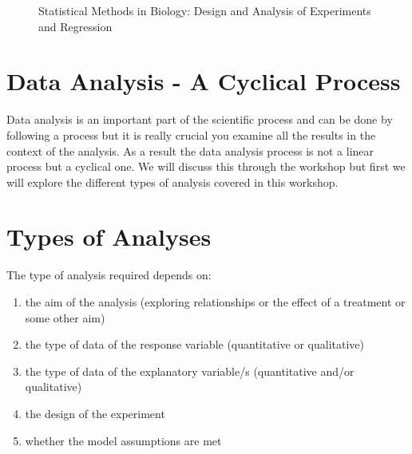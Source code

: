 \documentclass[a4paper, 10pt, fleqn, twosided]{memoir}
\begin{document}
\begin{figure}[!hbtp]
\centering
{}
\caption{Statistical Methods in Biology: Design and Analysis of Experiments and Regression}
\label{fig:welham}
\end{figure}

\clearpage
\section{Data Analysis - A Cyclical Process}
Data analysis is an important part of the scientific process and can be done by following a process but it is really
crucial you examine all the results in the context of the analysis. As a result the data analysis process is not a
linear process but a cyclical one. We will discuss this through the workshop but first we will explore the different
types of analysis covered in this workshop.

\section{Types of Analyses}

The type of analysis required depends on:

\begin{enumerate}
\item the aim of the analysis (exploring relationships or the effect of a treatment or some other aim)
\item the type of data of the response variable (quantitative or qualitative)
\item the type of data of the explanatory variable/s (quantitative and/or qualitative)
\item the design of the experiment
\item whether the model assumptions are met
\end{enumerate}
\end{document}
